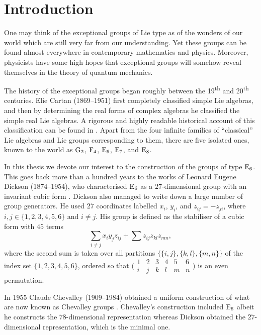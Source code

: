 \chapter*{Introduction}
\label{Intro}

One may think of the exceptional groups of Lie type 
as of the wonders of our
world which are still very far from our understanding. Yet these
groups can be found almost everywhere in contemporary mathematics
and physics. Moreover, physicists have some high hopes that
exceptional groups will somehow reveal themselves in the theory
of quantum mechanics. 

The history of the exceptional groups began roughly between
the 19\textsuperscript{th} and 
20\textsuperscript{th} centuries. Elie Cartan (1869--1951)
first completely classified simple Lie algebras, and then by 
determining the real forms of complex algebras he classified the
simple real Lie algebras. A rigorous and highly readable historical
account of this classification can be found in 
\cite{HawkinsThomas}. Apart from the four infinite families
of ``classical'' Lie algebras and Lie groups corresponding to
them, there are five isolated ones, known to the world as
$\mathrm{G}_2$, $\mathrm{F}_4$, $\mathrm{E}_6$, $\mathrm{E}_7$, and $\mathrm{E}_8$.

In this thesis we devote our interest to the construction of the
groups of type $\mathrm{E}_6$. This goes back more than a hundred years
to the works of Leonard Eugene Dickson (1874--1954),
who characterised $\mathrm{E}_6$ as a $27$-dimensional group with an
invariant cubic form \cite{Dickson1, Dickson2}. 
Dickson also managed to write down a 
large number of group generators. He used $27$ coordinates
labelled $x_i$, $y_i$, and $z_{ij} = -z_{ji}$, where 
$i,j \in \{1,2,3,4,5,6\}$ and $i \neq j$. His group is defined
as the stabiliser of a cubic form with $45$ terms
\begin{equation}
	\sum\limits_{i \neq j} x_i y_j z_{ij} + 
	\sum z_{ij} z_{kl} z_{mn},
\end{equation}
where the second sum is taken over all partitions 
$\{\{i, j\}, \{k, l\}, \{m, n\}\}$ of 
the index set
\mbox{$\{1,2,3,4,5,6\}$}, ordered so that $\bigl(\begin{smallmatrix}
  1 & 2 & 3 & 4 & 5 & 6 \\
  i & j & k & l & m & n
\end{smallmatrix}\bigr)$ is 
an even permutation.

In 1955 Claude Chevalley (1909--1984) obtained a uniform
construction of what are now known as Chevalley groups 
\cite{Chevalley}. Chevalley's construction included $\mathrm{E}_6$ albeit
he constructs the $78$-dimensional representation whereas
Dickson obtained the $27$-dimensional representation, which is
the minimal one. 

